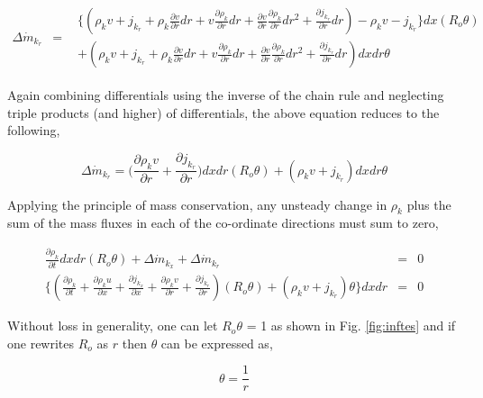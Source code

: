 \begin{displaymath}
	\begin{array}{ccc}
	\Delta \dot{m}_{k_r} & = &
		\begin{array}{c} 
	\Big\{(\rho_k v + j_{k_r} + \rho_k \frac{\partial v}{\partial r}dr + v \frac{\partial \rho_k}
	{\partial r}dr + \frac{\partial v}{\partial r} \frac{\partial \rho_k}{\partial r}dr^2 + \frac{\partial j_{k_r}}
	{\partial r}dr) -\rho_k v - j_{k_r}\Big\} dx(R_o \theta) \\
	+ (\rho_k v + j_{k_r} + \rho_k \frac{\partial v}{\partial r}dr + v \frac{\partial \rho_k}
	{\partial r}dr + \frac{\partial v}{\partial r} \frac{\partial \rho_k}{\partial r}dr^2 + \frac{\partial j_{k_r}}
	{\partial r}dr) dx dr \theta
		\end{array}
	\end{array}
\end{displaymath}

	Again combining differentials using the inverse of the chain rule and neglecting triple products (and higher)
of differentials, the above equation reduces to the following,

\begin{displaymath}
	\Delta \dot{m}_{k_r} = \Big( \frac{\partial \rho_k v}{\partial r} + \frac{\partial j_{k_r}}{\partial r}
	\Big)dxdr(R_o \theta) + (\rho_k v + j_{k_r})dxdr\theta
\end{displaymath}

	Applying the principle of mass conservation, any unsteady change in $\rho_k$ plus the sum of the mass fluxes in 
each of the co-ordinate directions must sum to zero,

\begin{displaymath}
	\begin{array}{ccc}
	\frac{\partial \rho_k}{\partial t}dxdr(R_o \theta) + \Delta \dot{m}_{k_x} + \Delta \dot{m}_{k_r} & = & 0 \\
	\Big\{(\frac{\partial \rho_k}{\partial t} + \frac{\partial \rho_k u}{\partial x} + \frac{\partial j_{k_x}}{\partial x}
	+  \frac{\partial \rho_k v}{\partial r} + \frac{\partial j_{k_r}}{\partial r})(R_o \theta) + 
	(\rho_k v + j_{k_r})\theta \Big\}dxdr & = & 0
	\end{array}
\end{displaymath}

	Without loss in generality, one can let $R_o \theta$ = 1 as shown in Fig. \ref{fig:inftes} and if one rewrites $R_o$ 
as $r$ then $\theta$ can be expressed as,	

\begin{equation}
	\theta = \frac {1}{r}
\label{eqn:theta}
\end{equation}

